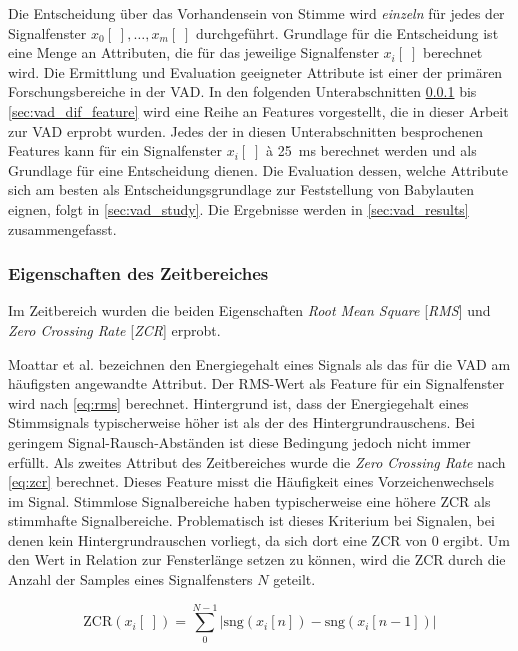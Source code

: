 Die Entscheidung über das Vorhandensein von Stimme wird \emph{einzeln} für jedes der Signalfenster $x_0[\;] , \ldots , x_m[\;]$ durchgeführt. Grundlage für die Entscheidung ist eine Menge an Attributen, die für das jeweilige Signalfenster $x_i[\;]$ berechnet wird. Die Ermittlung und Evaluation geeigneter Attribute ist einer der primären Forschungsbereiche in der VAD. In den folgenden Unterabschnitten \ref{sec:vad_time_features} bis \ref{sec:vad_dif_feature} wird eine Reihe an Features vorgestellt, die in dieser Arbeit zur VAD erprobt wurden. Jedes der in diesen Unterabschnitten besprochenen Features kann für ein Signalfenster $x_i[\;]$ \`{a} \SI{25}{\milli\second} berechnet werden und als Grundlage für eine Entscheidung dienen. Die Evaluation dessen, welche Attribute sich am besten als Entscheidungsgrundlage zur Feststellung von Babylauten eignen, folgt in \autoref{sec:vad_study}. Die Ergebnisse werden in \autoref{sec:vad_results} zusammengefasst.

\subsubsection{Eigenschaften des Zeitbereiches}
\label{sec:vad_time_features}

Im Zeitbereich wurden die beiden Eigenschaften \emph{Root Mean Square} [\emph{RMS}] und \emph{Zero Crossing Rate} [\emph{ZCR}] erprobt.

Moattar et al. \cite[S. 2549]{vad_Easy} bezeichnen den Energiegehalt eines Signals als das für die VAD am häufigsten angewandte Attribut. Der RMS-Wert als Feature für ein Signalfenster wird nach \autoref{eq:rms} berechnet. Hintergrund ist, dass der Energiegehalt eines Stimmsignals typischerweise höher ist als der des Hintergrundrauschens. Bei geringem Signal-Rausch-Abständen ist diese Bedingung jedoch nicht immer erfüllt. Als zweites Attribut des Zeitbereiches wurde die \emph{Zero Crossing Rate} nach \autoref{eq:zcr} berechnet. Dieses Feature misst die Häufigkeit eines Vorzeichenwechsels im Signal. Stimmlose Signalbereiche haben typischerweise eine höhere ZCR als stimmhafte Signalbereiche. Problematisch ist dieses Kriterium bei Signalen, bei denen kein Hintergrundrauschen vorliegt, da sich dort eine ZCR von 0 ergibt.\cite[S. 335 - 336]{vad_ceps} Um den Wert in Relation zur Fensterlänge setzen zu können, wird die ZCR durch die Anzahl der Samples eines Signalfensters $N$ geteilt.

\begin{equation}
\text{ZCR}(x_i[\;]) = \sum_{0}^{N-1}|\text{sng}(x_i[n])-\text{sng}(x_i[n-1])|
\label{eq:zcr}
\end{equation}

